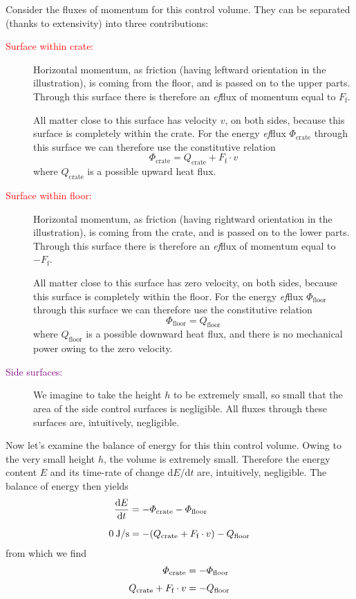 \documentclass[a4paper,12pt,%
onecolumn,oneside,%
british%
]{memoir}
\newcommand*{\di}{\mathrm{d}}%
\renewcommand*{\|}[1][]{\nonscript\:#1\vert\nonscript\:\mathopen{}}
\newcommand*{\dt}{\di t}
\newcommand*{\yE}{E}
\newcommand*{\yH}{\varPhi}%
\newcommand*{\yHfl}{\yH_{\textrm{floor}}}
\newcommand*{\yHc}{\yH_{\textrm{crate}}}
\newcommand*{\yQ}{Q}%
\newcommand*{\yQc}{\yQ_{\textrm{crate}}}
\newcommand*{\yQfl}{\yQ_{\textrm{floor}}}
\newcommand*{\yFf}{F_{\textrm{f}}}
\begin{document}
Consider the fluxes of momentum for this control volume. They can be separated (thanks to extensivity) into three contributions:
\begin{description}
\item[\textcolor{red}{Surface within crate:}] Horizontal momentum, as friction (having leftward orientation in the illustration), is coming from the floor, and is passed on to the upper parts. Through this surface there is therefore an \emph{ef}flux of momentum equal to $\yFf$.

All matter close to this surface has velocity $v$, on both sides, because this surface is completely within the crate. For the energy \emph{ef}flux  $\yHc$ through this surface we can therefore use the constitutive relation
\begin{equation*}
  \yHc = \yQc +\yFf\cdot v
\end{equation*}
where $\yQc$ is a possible upward heat flux.

\item[\textcolor{red}{Surface within floor:}] Horizontal momentum, as friction (having rightward orientation in the illustration), is coming from the crate, and is passed on to the lower parts. Through this surface there is therefore an \emph{ef}flux of momentum equal to $-\yFf$.

  All matter close to this surface has zero velocity, on both sides, because this surface is completely within the floor. For the energy \emph{ef}flux $\yHfl$ through this surface we can therefore use the constitutive relation
\begin{equation*}
  \yHfl = \yQfl
\end{equation*}
where $\yQfl$ is a possible downward heat flux, and there is no mechanical power owing to the zero velocity.

\item[\textcolor{purple}{Side surfaces:}] We imagine to take the height $h$ to be extremely small, so small that the area of the side control surfaces is negligible. All fluxes through these surfaces are, intuitively, negligible.
\end{description}

Now let's examine the balance of energy for this thin control volume. Owing to the very small height $h$, the volume is extremely small. Therefore the energy content $\yE$ and its time-rate of change $\di\yE/\dt$ are, intuitively, negligible. The balance of energy then yields
\begin{equation*}
  \begin{aligned}
    \frac{\di\yE}{\dt} &= -\yHc -\yHfl
    \\[2\jot]
    \qty{0}{J/s}&= - (\yQc + \yFf\cdot v) - \yQfl
  \end{aligned}
\end{equation*}
from which we find
\begin{equation*}
  \begin{aligned}
    \yHc &= -\yHfl \\[\jot]  \yQc + \yFf \cdot v &= -\yQfl
  \end{aligned}
\end{equation*}
\end{document}
